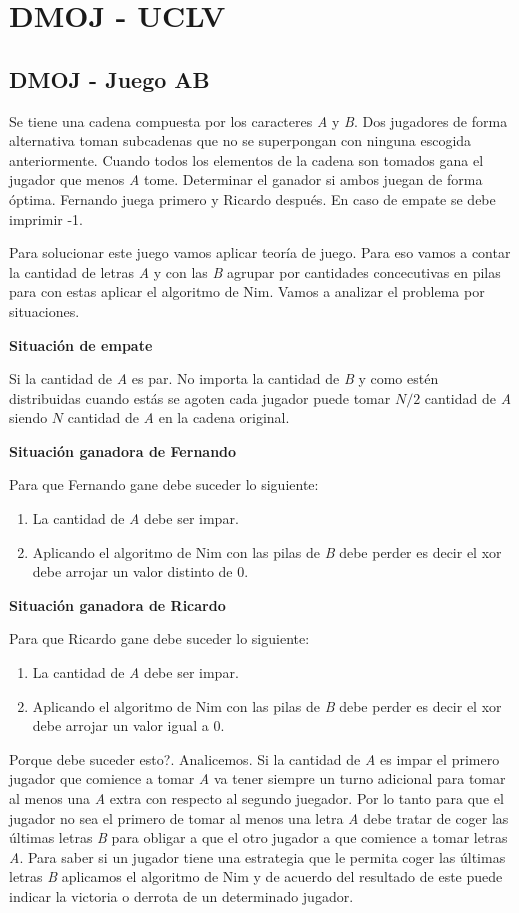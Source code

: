 \section{DMOJ - UCLV}

\subsection{DMOJ - Juego AB} Se tiene una cadena compuesta por los caracteres \emph{A} y \emph{B}. Dos jugadores de forma alternativa toman subcadenas que no se superpongan con ninguna escogida anteriormente. Cuando todos los elementos de la cadena son tomados gana el jugador que menos \emph{A} tome. Determinar el ganador si ambos juegan de forma óptima. Fernando juega primero y Ricardo después. En caso de empate se debe imprimir -1. 

Para solucionar este juego vamos aplicar teoría de juego. Para eso vamos a contar la cantidad de letras \emph{A} y con las \emph{B} agrupar por cantidades concecutivas en pilas para con estas aplicar el algoritmo de Nim. Vamos a analizar el problema por situaciones.

\textbf{Situación de empate}

Si la cantidad de \emph{A} es par. No importa la cantidad de \emph{B} y como estén distribuidas cuando estás se agoten cada jugador puede tomar $N/2$ cantidad de \emph{A} siendo $N$ cantidad de \emph{A} en la cadena original.

\textbf{Situación ganadora de Fernando}

Para que Fernando gane debe suceder lo siguiente:
\begin{enumerate}
	\item La cantidad de \emph{A} debe ser impar.
	\item Aplicando el algoritmo de Nim con las pilas de \emph{B} debe perder es decir el xor debe arrojar un valor distinto de 0.
\end{enumerate}

\textbf{Situación ganadora de Ricardo}

Para que Ricardo gane debe suceder lo siguiente:
\begin{enumerate}
	\item La cantidad de \emph{A} debe ser impar.
	\item Aplicando el algoritmo de Nim con las pilas de \emph{B} debe perder es decir el xor debe arrojar un valor igual a 0.
\end{enumerate}

Porque debe suceder esto?. Analicemos. Si la cantidad de \emph{A} es impar el primero jugador que comience a tomar \emph{A} va tener siempre un turno adicional para tomar al menos una \emph{A} extra con respecto al segundo juegador. Por lo tanto para que el jugador no sea el primero de tomar al menos una letra \emph{A} debe tratar de coger las últimas letras \emph{B} para obligar a que el otro jugador a que comience a tomar letras \emph{A}. Para saber si un jugador tiene una estrategia que le permita coger las últimas letras \emph{B} aplicamos el algoritmo de Nim y de acuerdo del resultado de este puede indicar la victoria o derrota de un determinado jugador.

